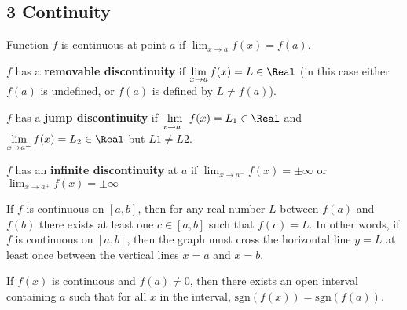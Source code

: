 \subsection*{3 Continuity}

\begin{definition}
  Function $f$ is continuous at point $a$ if $\displaystyle\lim_{x \to a} f (x) = f (a)$.
\end{definition}

\begin{definition}
  $f$ has a \textbf{removable discontinuity} if $\displaystyle\lim_{x \to a} f (x) = L \in \Real$ (in this case either $f (a)$ is undefined, or $f (a)$ is defined by $L \neq f (a)$).
\end{definition}
\begin{definition}
  $f$ has a \textbf{jump discontinuity} if $\displaystyle\lim_{x \to a^-} f (x) = L_1 \in \Real$ and $\displaystyle\lim_{x \to a^+} f (x) = L_2 \in \Real$ but $L1 \neq L2$.
\end{definition}
\begin{definition}
  $f$ has an \textbf{infinite discontinuity} at $a$ if $\displaystyle\lim_{x \to a^-} f (x) = \pm\infty$ or $\displaystyle\lim_{x \to a^+} f (x) = \pm\infty$
\end{definition}

\begin{namedtheorem}
  If $f$ is continuous on $[a, b]$, then for any real number $L$ between $f (a)$ and $f (b)$ there exists at least one $c \in [a, b]$ such that $f (c) = L$. In other
  words, if $f$ is continuous on $[a, b]$, then the graph must cross the horizontal line $y = L$ at least once
  between the vertical lines $x = a$ and $x = b$.
\end{namedtheorem}

\begin{namedtheorem}
  If $f(x)$ is continuous and $f(a) \neq 0$, then there exists an open interval containing $a$ such that for all $x$ in the interval, $\text{sgn}(f(x)) = \text{sgn}(f(a))$.
\end{namedtheorem}



